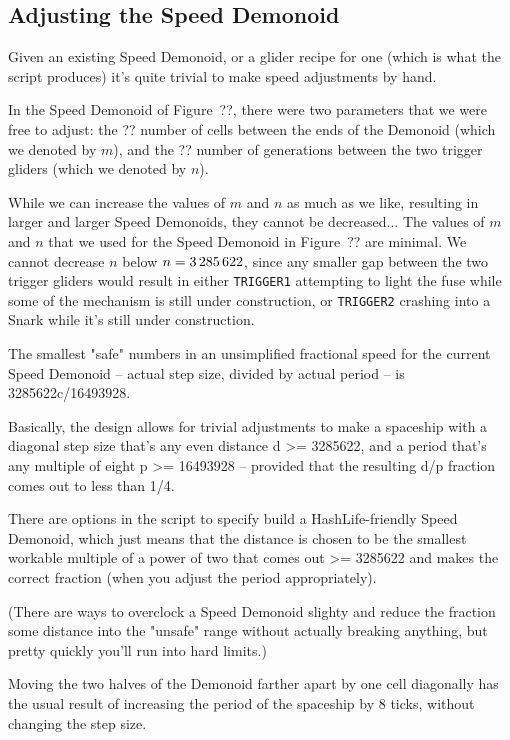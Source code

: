 \subsection{Adjusting the Speed Demonoid}\label{sec:speed_demonoid_adjust}

Given an existing Speed Demonoid, or a glider recipe for one (which is what the script produces) it's quite trivial to make speed adjustments by hand.

In the Speed Demonoid of Figure~??, there were two parameters that we were free to adjust: the ?? number of cells between the ends of the Demonoid (which we denoted by $m$), and the ?? number of generations between the two trigger gliders (which we denoted by $n$).

While we can increase the values of $m$ and $n$ as much as we like, resulting in larger and larger Speed Demonoids, they cannot be decreased... The values of $m$ and $n$ that we used for the Speed Demonoid in Figure~?? are minimal. We cannot decrease $n$ below $n = 3{\,}285{\,}622$, since any smaller gap between the two trigger gliders would result in either \texttt{TRIGGER1} attempting to light the fuse while some of the mechanism is still under construction, or \texttt{TRIGGER2} crashing into a Snark while it's still under construction.

The smallest "safe" numbers in an unsimplified fractional speed for the current Speed Demonoid -- actual step size, divided by actual period -- is 3285622c/16493928.

Basically, the design allows for trivial adjustments to make a spaceship with a diagonal step size that's any even distance d >= 3285622, and a period that's any multiple of eight p >= 16493928 -- provided that the resulting d/p fraction comes out to less than 1/4.


There are options in the script to specify build a HashLife-friendly Speed Demonoid, which just means that the distance is chosen to be the smallest workable multiple of a power of two that comes out >= 3285622 and makes the correct fraction (when you adjust the period appropriately).

(There are ways to overclock a Speed Demonoid slighty and reduce the fraction some distance into the "unsafe" range without actually breaking anything, but pretty quickly you'll run into hard limits.)

Moving the two halves of the Demonoid farther apart by one cell diagonally has the usual result of increasing the period of the spaceship by 8 ticks, without changing the step size.

